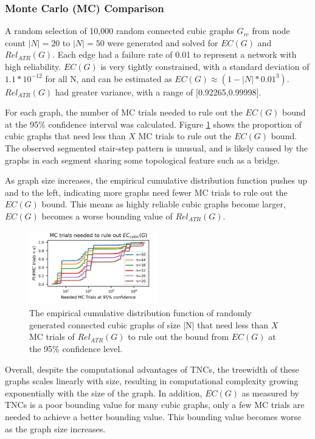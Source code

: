 \hypertarget{monte-carlo-mc-comparison-1}{%
\subsubsection{Monte Carlo (MC) Comparison}\label{monte-carlo-mc-comparison-1}}

A random selection of 10,000 random connected cubic graphs \(G_{rc}\) from node count \(|N|=20\) to \(|N|=50\) were generated and solved for \(EC(G)\) and \(Rel_{ATR}(G)\). Each edge had a failure rate of 0.01 to represent a network with high reliability. \(EC(G)\) is very tightly constrained, with a standard deviation of \(1.1*10^{-12}\) for all \textbar N\textbar, and can be estimated as \(EC(G) \approx (1-|N|*0.01^3)\). \(Rel_{ATR}(G)\) had greater variance, with a range of {[}0.92265,0.99998{]}.

For each graph, the number of MC trials needed to rule out the \(EC(G)\) bound at the 95\% confidence interval was calculated. Figure \ref{fig:Random Cubic MC} shows the proportion of cubic graphs that need less than \(X\) MC trials to rule out the \(EC(G)\) bound. The observed segmented stair-step pattern is unusual, and is likely caused by the graphs in each segment sharing some topological feature such as a bridge.

As graph size increases, the empirical cumulative distribution function pushes up and to the left, indicating more graphs need fewer MC trials to rule out the \(EC(G)\) bound. This means as highly reliable cubic graphs become larger, \(EC(G)\) becomes a worse bounding value of \(Rel_{ATR}(G)\).

\begin{figure}[t]
\caption{The empirical cumulative distribution function of randomly generated connected cubic graphs of size |N| that need less than $X$ MC trials of $Rel_{ATR}(G)$ to rule out the bound from $EC(G)$ at the 95\% confidence level.}
\label{fig:Random Cubic MC}
\includegraphics[width=0.5\textwidth]{../figures/RcubicTrials.png}
\end{figure}

Overall, despite the computational advantages of TNCs, the treewidth of these graphs scales linearly with size, resulting in computational complexity growing exponentially with the size of the graph. In addition, \(EC(G)\) as measured by TNCs is a poor bounding value for many cubic graphs, only a few MC trials are needed to achieve a better bounding value. This bounding value becomes worse as the graph size increases.

